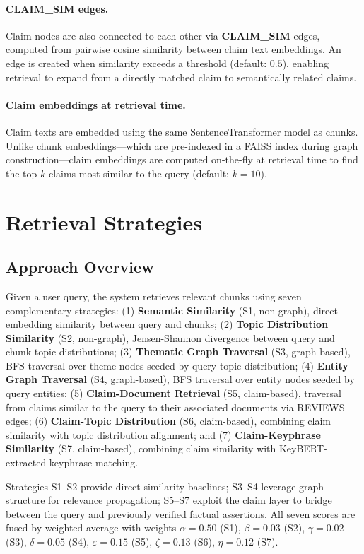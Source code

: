 \documentclass[10pt]{article}
\begin{document}
\paragraph{CLAIM\_SIM edges.} Claim nodes are also connected to each other via \textbf{CLAIM\_SIM} edges, computed from pairwise cosine similarity between claim text embeddings. An edge is created when similarity exceeds a threshold (default: $0.5$), enabling retrieval to expand from a directly matched claim to semantically related claims.

\paragraph{Claim embeddings at retrieval time.} Claim texts are embedded using the same SentenceTransformer model as chunks. Unlike chunk embeddings---which are pre-indexed in a FAISS index during graph construction---claim embeddings are computed on-the-fly at retrieval time to find the top-$k$ claims most similar to the query (default: $k=10$).


\section{Retrieval Strategies}
\label{sec:retrieval}

\subsection{Approach Overview}

Given a user query, the system retrieves relevant chunks using seven complementary strategies: (1) \textbf{Semantic Similarity} (S1, non-graph), direct embedding similarity between query and chunks; (2) \textbf{Topic Distribution Similarity} (S2, non-graph), Jensen-Shannon divergence between query and chunk topic distributions; (3) \textbf{Thematic Graph Traversal} (S3, graph-based), BFS traversal over theme nodes seeded by query topic distribution; (4) \textbf{Entity Graph Traversal} (S4, graph-based), BFS traversal over entity nodes seeded by query entities; (5) \textbf{Claim-Document Retrieval} (S5, claim-based), traversal from claims similar to the query to their associated documents via REVIEWS edges; (6) \textbf{Claim-Topic Distribution} (S6, claim-based), combining claim similarity with topic distribution alignment; and (7) \textbf{Claim-Keyphrase Similarity} (S7, claim-based), combining claim similarity with KeyBERT-extracted keyphrase matching.

Strategies S1--S2 provide direct similarity baselines; S3--S4 leverage graph structure for relevance propagation; S5--S7 exploit the claim layer to bridge between the query and previously verified factual assertions. All seven scores are fused by weighted average with weights $\alpha=0.50$ (S1), $\beta=0.03$ (S2), $\gamma=0.02$ (S3), $\delta=0.05$ (S4), $\varepsilon=0.15$ (S5), $\zeta=0.13$ (S6), $\eta=0.12$ (S7).
\end{document}
